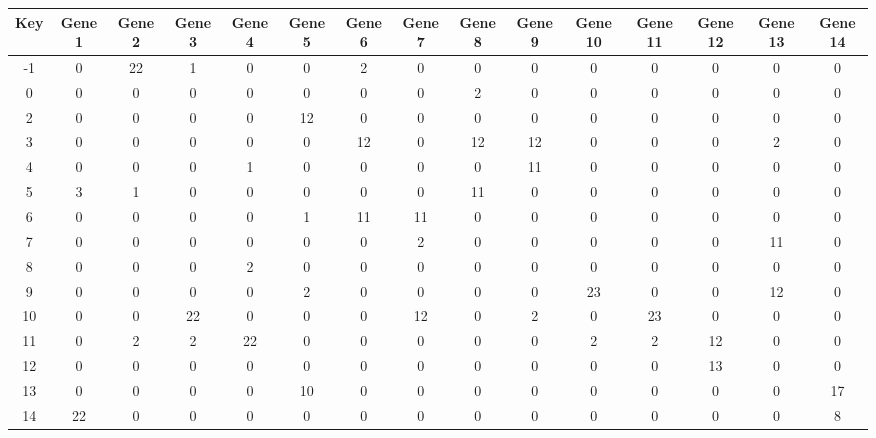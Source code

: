 \begin{tabular}{|c|c|c|c|c|c|c|c|c|c|c|c|c|c|c|}
\hline
Key & Gene 1 & Gene 2 & Gene 3 & Gene 4 & Gene 5 & Gene 6 & Gene 7 & Gene 8 & Gene 9 & Gene 10 & Gene 11 & Gene 12 & Gene 13 & Gene 14 \\
\hline
-1 & 0 & 22 & 1 & 0 & 0 & 2 & 0 & 0 & 0 & 0 & 0 & 0 & 0 & 0 \\
0 & 0 & 0 & 0 & 0 & 0 & 0 & 0 & 2 & 0 & 0 & 0 & 0 & 0 & 0 \\
2 & 0 & 0 & 0 & 0 & 12 & 0 & 0 & 0 & 0 & 0 & 0 & 0 & 0 & 0 \\
3 & 0 & 0 & 0 & 0 & 0 & 12 & 0 & 12 & 12 & 0 & 0 & 0 & 2 & 0 \\
4 & 0 & 0 & 0 & 1 & 0 & 0 & 0 & 0 & 11 & 0 & 0 & 0 & 0 & 0 \\
5 & 3 & 1 & 0 & 0 & 0 & 0 & 0 & 11 & 0 & 0 & 0 & 0 & 0 & 0 \\
6 & 0 & 0 & 0 & 0 & 1 & 11 & 11 & 0 & 0 & 0 & 0 & 0 & 0 & 0 \\
7 & 0 & 0 & 0 & 0 & 0 & 0 & 2 & 0 & 0 & 0 & 0 & 0 & 11 & 0 \\
8 & 0 & 0 & 0 & 2 & 0 & 0 & 0 & 0 & 0 & 0 & 0 & 0 & 0 & 0 \\
9 & 0 & 0 & 0 & 0 & 2 & 0 & 0 & 0 & 0 & 23 & 0 & 0 & 12 & 0 \\
10 & 0 & 0 & 22 & 0 & 0 & 0 & 12 & 0 & 2 & 0 & 23 & 0 & 0 & 0 \\
11 & 0 & 2 & 2 & 22 & 0 & 0 & 0 & 0 & 0 & 2 & 2 & 12 & 0 & 0 \\
12 & 0 & 0 & 0 & 0 & 0 & 0 & 0 & 0 & 0 & 0 & 0 & 13 & 0 & 0 \\
13 & 0 & 0 & 0 & 0 & 10 & 0 & 0 & 0 & 0 & 0 & 0 & 0 & 0 & 17 \\
14 & 22 & 0 & 0 & 0 & 0 & 0 & 0 & 0 & 0 & 0 & 0 & 0 & 0 & 8 \\
\hline
\end{tabular}
